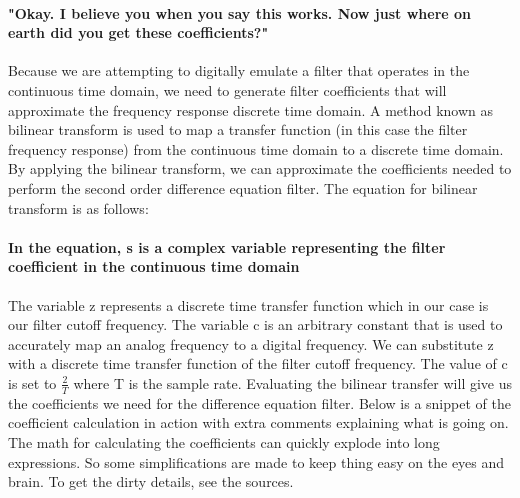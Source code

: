 \documentclass[acmlarge,screen]{acmart}
\begin{document}
	\paragraph{"Okay. I believe you when you say this works. Now just where on earth did you get these coefficients?"} Because we are attempting to digitally emulate a filter that operates in the continuous time domain, we need to generate filter coefficients that will approximate the frequency response discrete time domain. A method known as bilinear transform is used to map a transfer function (in this case the filter frequency response) from the continuous time domain to a discrete time domain. By applying the bilinear transform, we can approximate the coefficients needed to perform the second order difference equation filter. The equation for bilinear transform is as follows: \cite{stanford_2007} 
	
	
	\paragraph{In the equation, s is a complex variable representing the filter coefficient in the continuous time domain} The variable z represents a discrete time transfer function which in our case is our filter cutoff frequency. The variable c is an arbitrary constant that is used to accurately map an analog frequency to a digital frequency. We can substitute z with a discrete time transfer function of the  filter cutoff frequency. The value of c is set to \( \frac{2}{T} \) where T is the sample rate. Evaluating the bilinear transfer will give us the coefficients we need for the difference equation filter. Below is a snippet of the coefficient calculation in action with extra comments explaining what is going on. The math for calculating the coefficients can quickly explode into long expressions. So some simplifications are made to keep thing easy on the eyes and brain. To get the dirty details, see the sources.
	
\end{document}
